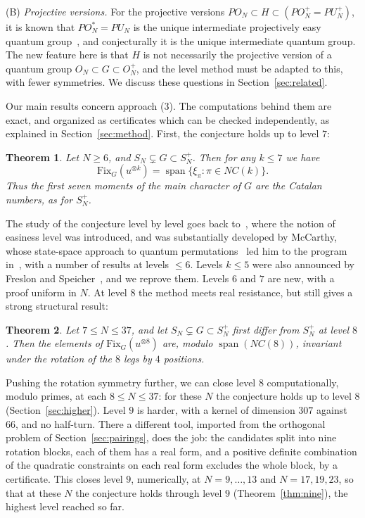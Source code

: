 \documentclass[11pt]{amsart}
\theoremstyle{definition}
\theoremstyle{remark}
\theoremstyle{plain}
\newtheorem{introtheorem}{Theorem}
\numberwithin{equation}{section}
\numberwithin{table}{section}
\newcommand{\Fix}{\mathrm{Fix}}
\DeclareMathOperator{\spn}{span}
\begin{document}
\smallskip
(B) \emph{Projective versions.} For the projective versions $PO_N\subset H\subset(PO_N^+=PU_N^+)$, it is known that $PO_N^*=PU_N$ is the unique intermediate projectively easy quantum group~\cite{bme}, and conjecturally it is the unique intermediate quantum group. The new feature here is that $H$ is not necessarily the projective version of a quantum group $O_N\subset G\subset O_N^+$, and the level method must be adapted to this, with fewer symmetries. We discuss these questions in Section~\ref{sec:related}.

\smallskip
Our main results concern approach (3). The computations behind them are exact, and organized as certificates which can be checked independently, as explained in Section~\ref{sec:method}. First, the conjecture holds up to level $7$:

\begin{introtheorem}
Let $N\ge6$, and $S_N\subsetneq G\subset S_N^+$. Then for any $k\le7$ we have
\[
\Fix_G(u^{\otimes k})=\spn\big\{\xi_\pi:\pi\in NC(k)\big\}.
\]
Thus the first seven moments of the main character of $G$ are the Catalan numbers, as for $S_N^+$.
\end{introtheorem}

The study of the conjecture level by level goes back to~\cite{bah}, where the notion of easiness level was introduced, and was substantially developed by McCarthy, whose state-space approach to quantum permutations~\cite{mc0} led him to the program in~\cite{mc1,mc2}, with a number of results at levels $\le6$. Levels $k\le5$ were also announced by Freslon and Speicher~\cite{fs}, and we reprove them. Levels $6$ and $7$ are new, with a proof uniform in $N$. At level $8$ the method meets real resistance, but still gives a strong structural result:

\begin{introtheorem}
Let $7\le N\le37$, and let $S_N\subsetneq G\subset S_N^+$ first differ from $S_N^+$ at level $8$. Then the elements of $\Fix_G(u^{\otimes8})$ are, modulo $\spn(NC(8))$, invariant under the rotation of the $8$ legs by $4$ positions.
\end{introtheorem}

Pushing the rotation symmetry further, we can close level $8$ computationally, modulo primes, at each $8\le N\le37$: for these $N$ the conjecture holds up to level $8$ (Section~\ref{sec:higher}). Level $9$ is harder, with a kernel of dimension $307$ against $66$, and no half-turn. There a different tool, imported from the orthogonal problem of Section~\ref{sec:pairings}, does the job: the candidates split into nine rotation blocks, each of them has a real form, and a positive definite combination of the quadratic constraints on each real form excludes the whole block, by a certificate. This closes level $9$, numerically, at $N=9,\dots,13$ and $N=17,19,23$, so that at these $N$ the conjecture holds through level $9$ (Theorem~\ref{thm:nine}), the highest level reached so far.
\end{document}
